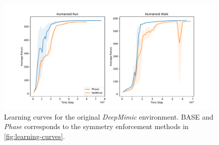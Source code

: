 \begin{figure}
  \centering
  \includegraphics[width=0.9\columnwidth]{symmetry_figures/DeepMimic_curves.pdf}
  \caption{Learning curves for the original \textit{DeepMimic} environment. BASE and \textit{Phase} corresponds to the symmetry enforcement methods in \autoref{fig:learning-curves}.}
  \label{fig:deepmimic-curves}
\end{figure}